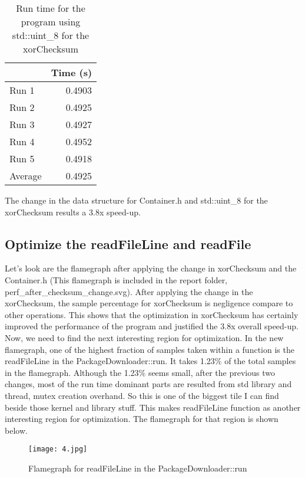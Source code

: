 \documentclass[12pt]{article}
\begin{document}
\begin{table}[H]
  \centering
  \begin{tabular}{lr}
    & {\bf Time (s)} \\
    \hline
    Run 1 & 0.4903 \\
    Run 2 & 0.4925 \\
    Run 3 & 0.4927 \\
    Run 4 & 0.4952 \\
    Run 5 & 0.4918 \\
    \hline
    Average & 0.4925 \\
  \end{tabular}
  \caption{Run time for the program using std::uint\_8 for the xorChecksum}
  \label{tbl-fib-sequential}
\end{table}

\noindent 
The change in the data structure for Container.h and std::uint\_8 for the xorChecksum results a 3.8x speed-up.

\subsection{Optimize the readFileLine and readFile}
\noindent
Let's look are the flamegraph after applying the change in xorChecksum and the Container.h (This flamegraph is included in the report folder, perf\_after\_checksum\_change.svg). After applying the change in the xorChecksum, the sample percentage for xorChecksum is negligence compare to other operations. This shows that the optimization in xorChecksum has certainly improved the performance of the program and justified the 3.8x overall speed-up. \\

\noindent
Now, we need to find the next interesting region for optimization. In the new flamegraph, one of the highest fraction of samples taken within a function is the readFileLine in the PackageDownloader::run. It takes 1.23\% of the total samples in the flamegraph. Although the 1.23\% seems small, after the previous two changes, most of the run time dominant parts are resulted from std library and thread, mutex creation overhand. So this is one of the biggest tile I can find beside those kernel and library stuff. This makes readFileLine function as another interesting region for optimization. The flamegraph for that region is shown below.

\begin{figure}[htb!]
  \centering
  \texttt{[image: 4.jpg]}
  \caption{Flamegraph for readFileLine in the PackageDownloader::run}
\end{figure}
\end{document}
